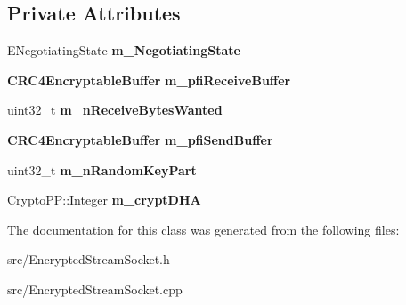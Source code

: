 \subsection*{Private Attributes}
\begin{DoxyCompactItemize}
\item 
ENegotiatingState {\bfseries m\_\-NegotiatingState}\label{classCEncryptedStreamSocket_a4dce66e31cbe2cc390df26a07fa9d24e}

\item 
{\bf CRC4EncryptableBuffer} {\bfseries m\_\-pfiReceiveBuffer}\label{classCEncryptedStreamSocket_a539facae7574ff6893cec98db863d6df}

\item 
uint32\_\-t {\bfseries m\_\-nReceiveBytesWanted}\label{classCEncryptedStreamSocket_a641b5098c0bcac64d74fc363ade23d44}

\item 
{\bf CRC4EncryptableBuffer} {\bfseries m\_\-pfiSendBuffer}\label{classCEncryptedStreamSocket_ab17644f5f11901caae2b4c08d4a4a37c}

\item 
uint32\_\-t {\bfseries m\_\-nRandomKeyPart}\label{classCEncryptedStreamSocket_aaa37c68677dcc4154cf44739dbabd1b2}

\item 
CryptoPP::Integer {\bfseries m\_\-cryptDHA}\label{classCEncryptedStreamSocket_a689741325df2f2daaf607becbbaba735}

\end{DoxyCompactItemize}


The documentation for this class was generated from the following files:\begin{DoxyCompactItemize}
\item 
src/EncryptedStreamSocket.h\item 
src/EncryptedStreamSocket.cpp\end{DoxyCompactItemize}
